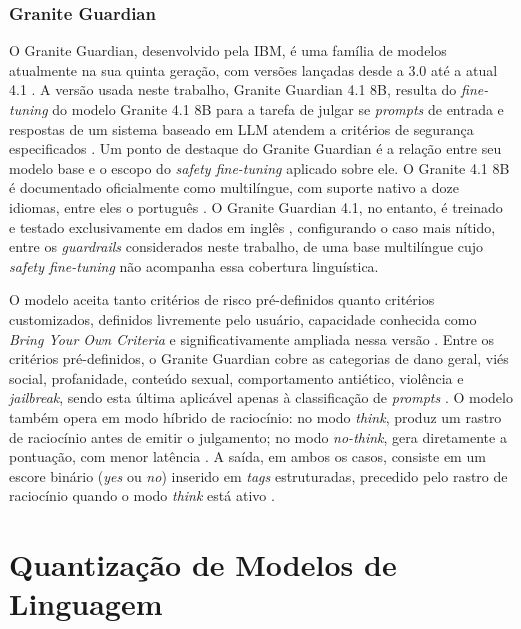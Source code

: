 \subsubsection{Granite Guardian}
\label{subsec:granite-guardian}

O Granite Guardian, desenvolvido pela IBM, é uma família de modelos atualmente na sua quinta geração, com versões lançadas desde a 3.0 até a atual 4.1 \cite{padhi2025granite, graniteguardian41hf}. A versão usada neste trabalho, Granite Guardian 4.1 8B, resulta do \textit{fine-tuning} do modelo Granite 4.1 8B para a tarefa de julgar se \textit{prompts} de entrada e respostas de um sistema baseado em LLM atendem a critérios de segurança especificados \cite{graniteguardian41hf}. Um ponto de destaque do Granite Guardian é a relação entre seu modelo base e o escopo do \textit{safety fine-tuning} aplicado sobre ele. O Granite 4.1 8B é documentado oficialmente como multilíngue, com suporte nativo a doze idiomas, entre eles o português \cite{granite418bhf}. O Granite Guardian 4.1, no entanto, é treinado e testado exclusivamente em dados em inglês \cite{graniteguardian41hf}, configurando o caso mais nítido, entre os \textit{guardrails} considerados neste trabalho, de uma base multilíngue cujo \textit{safety fine-tuning} não acompanha essa cobertura linguística.

O modelo aceita tanto critérios de risco pré-definidos quanto critérios customizados, definidos livremente pelo usuário, capacidade conhecida como \textit{Bring Your Own Criteria} e significativamente ampliada nessa versão \cite{graniteguardian41hf}. Entre os critérios pré-definidos, o Granite Guardian cobre as categorias de dano geral, viés social, profanidade, conteúdo sexual, comportamento antiético, violência e \textit{jailbreak}, sendo esta última aplicável apenas à classificação de \textit{prompts} \cite{graniteguardian41hf}. O modelo também opera em modo híbrido de raciocínio: no modo \textit{think}, produz um rastro de raciocínio antes de emitir o julgamento; no modo \textit{no-think}, gera diretamente a pontuação, com menor latência \cite{graniteguardian41hf}. A saída, em ambos os casos, consiste em um escore binário (\textit{yes} ou \textit{no}) inserido em \textit{tags} estruturadas, precedido pelo rastro de raciocínio quando o modo \textit{think} está ativo \cite{graniteguardian41hf}.

\section{Quantização de Modelos de Linguagem}

